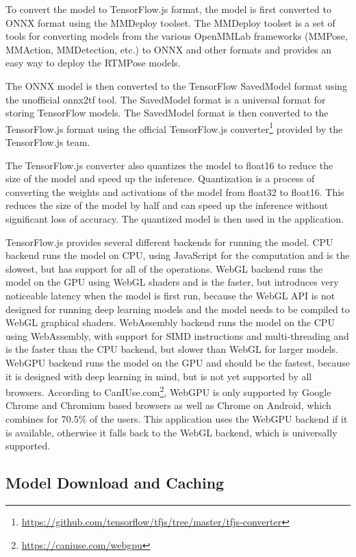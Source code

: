 To convert the model to TensorFlow.js format, the model is first converted to ONNX format using the MMDeploy \cite{mmdeploy} toolset. The MMDeploy toolset is a set of tools for converting models from the various OpenMMLab frameworks (MMPose, MMAction, MMDetection, etc.) to ONNX and other formats and provides an easy way to deploy the RTMPose models.

The ONNX model is then converted to the TensorFlow SavedModel format using the unofficial onnx2tf \cite{onnx2tf} tool. The SavedModel format is a universal format for storing TensorFlow models. The SavedModel format is then converted to the TensorFlow.js format using the official TensorFlow.js converter\footnote{\url{https://github.com/tensorflow/tfjs/tree/master/tfjs-converter}} provided by the TensorFlow.js team.

The TensorFlow.js converter also quantizes the model to float16 to reduce the size of the model and speed up the inference. Quantization is a process of converting the weights and activations of the model from float32 to float16. This reduces the size of the model by half and can speed up the inference without significant loss of accuracy. The quantized model is then used in the application.

TensorFlow.js provides several different backends for running the model. CPU backend runs the model on CPU, using JavaScript for the computation and is the slowest, but has support for all of the operations. WebGL backend runs the model on the GPU using WebGL shaders and is the faster, but introduces very noticeable latency when the model is first run, because the WebGL API is not designed for running deep learning models and the model needs to be compiled to WebGL graphical shaders. WebAssembly backend runs the model on the CPU using WebAssembly, with support for SIMD instructions and multi-threading and is the faster than the CPU backend, but slower than WebGL for larger models. WebGPU backend runs the model on the GPU and should be the fastest, because it is designed with deep learning in mind, but is not yet supported by all browsers. According to CanIUse.com\footnote{\url{https://caniuse.com/webgpu}}, WebGPU is only supported by Google Chrome and Chromium based browsers as well as Chrome on Android, which combines for 70.5\% of the users. This application uses the WebGPU backend if it is available, otherwise it falls back to the WebGL backend, which is universally supported.

\subsection{Model Download and Caching}

